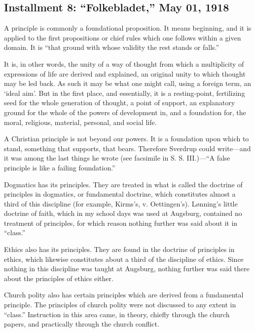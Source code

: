 
\subsection{Installment 8: “Folkebladet,” May 01, 1918}

A principle is commonly a foundational proposition. It means beginning, and it is applied to the first propositions or chief rules which one follows within a given domain. It is “that ground with whose validity the rest stands or falls.”

It is, in other words, the unity of a way of thought from which a multiplicity of expressions of life are derived and explained, an original unity to which thought may be led back. As such it may be what one might call, using a foreign term, an ‘ideal aim’. But in the first place, and essentially, it is a resting-point, fertilizing seed for the whole generation of thought, a point of support, an explanatory ground for the whole of the powers of development in, and a foundation for, the moral, religious, material, personal, and social life.

A Christian principle is not beyond our powers. It is a foundation upon which to stand, something that supports, that bears. Therefore Sverdrup could write—and it was among the last things he wrote (see facsimile in S. S. III.)—“A false principle is like a failing foundation.”

Dogmatics has its principles. They are treated in what is called the doctrine of principles in dogmatics, or fundamental doctrine, which constitutes almost a third of this discipline (for example, Kirms’s, v. Oettingen’s). Lønning’s little doctrine of faith, which in my school days was used at Augsburg, contained no treatment of principles, for which reason nothing further was said about it in “class.”

Ethics also has its principles. They are found in the doctrine of principles in ethics, which likewise constitutes about a third of the discipline of ethics. Since nothing in this discipline was taught at Augsburg, nothing further was said there about the principles of ethics either.

Church polity also has certain principles which are derived from a fundamental principle. The principles of church polity were not discussed to any extent in “class.” Instruction in this area came, in theory, chiefly through the church papers, and practically through the church conflict.

